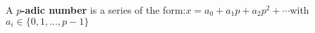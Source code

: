 \documentclass[preview]{standalone}
\begin{document}
\begin{flushleft}
A \textbf{$p$-adic number} is a series of the form:$x = a_0 + a_1p + a_2p^2 + \cdots$with $a_i \in \{0, 1, ..., p-1\}$
\end{flushleft}
\end{document}
